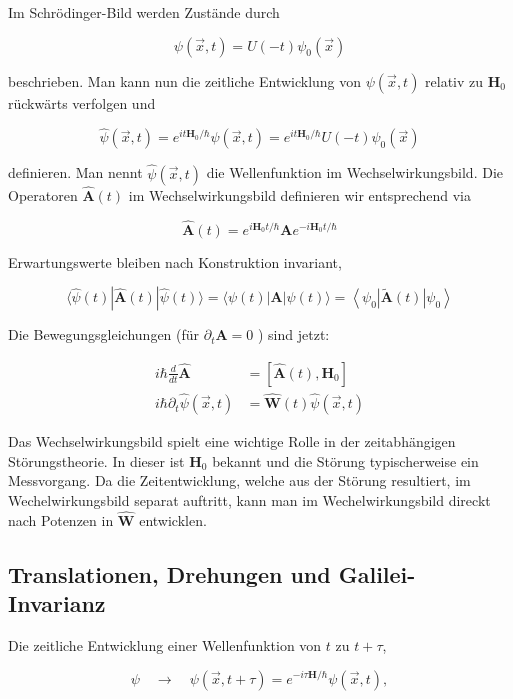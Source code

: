 \documentclass[10pt, letterpaper]{article}
\begin{document}
Im Schrödinger-Bild werden Zustände durch

$$
\psi(\vec{x}, t)=U(-t) \psi_{0}(\vec{x})
$$

beschrieben. Man kann nun die zeitliche Entwicklung von $\psi(\vec{x}, t)$ relativ zu $\mathbf{H}_{0}$ rückwärts verfolgen und

$$
\widehat{\psi}(\vec{x}, t)=e^{i t \mathbf{H}_{0} / \hbar} \psi(\vec{x}, t)=e^{i t \mathbf{H}_{0} / \hbar} U(-t) \psi_{0}(\vec{x})
$$

definieren. Man nennt $\widehat{\psi}(\vec{x}, t)$ die Wellenfunktion im Wechselwirkungsbild. Die Operatoren $\widehat{\mathbf{A}}(t)$ im Wechselwirkungsbild definieren wir entsprechend via

$$
\widehat{\mathbf{A}}(t)=e^{i \mathbf{H}_{0} t / \hbar} \mathbf{A} e^{-i \mathbf{H}_{0} t / \hbar}
$$

Erwartungswerte bleiben nach Konstruktion invariant,

$$
\langle\widehat{\psi}(t)| \widehat{\mathbf{A}}(t)|\widehat{\psi}(t)\rangle=\langle\psi(t)| \mathbf{A}|\psi(t)\rangle=\left\langle\psi_{0}\right| \tilde{\mathbf{A}}(t)\left|\psi_{0}\right\rangle
$$

Die Bewegungsgleichungen (für $\partial_{t} \mathbf{A}=0$ ) sind jetzt:

$$
\begin{aligned}
i \hbar \frac{d}{d t} \widehat{\mathbf{A}} & =\left[\widehat{\mathbf{A}}(t), \mathbf{H}_{0}\right] \\
i \hbar \partial_{t} \widehat{\psi}(\vec{x}, t) & =\widehat{\mathbf{W}}(t) \widehat{\psi}(\vec{x}, t)
\end{aligned}
$$

Das Wechselwirkungsbild spielt eine wichtige Rolle in der zeitabhängigen Störungstheorie. In dieser ist $\mathbf{H}_{0}$ bekannt und die Störung typischerweise ein Messvorgang. Da die Zeitentwicklung, welche aus der Störung resultiert, im Wechelwirkungsbild separat auftritt, kann man im Wechelwirkungsbild direckt nach Potenzen in $\widehat{\mathbf{W}}$ entwicklen.

\subsection*{Translationen, Drehungen und Galilei-Invarianz}
Die zeitliche Entwicklung einer Wellenfunktion von $t$ zu $t+\tau$,

$$
\psi \quad \rightarrow \quad \psi(\vec{x}, t+\tau)=e^{-i \tau \mathbf{H} / \hbar} \psi(\vec{x}, t),
$$
\end{document}
